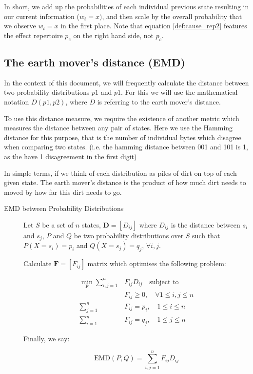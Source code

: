 In short, we add up the probabilities of each individual previous state resulting in our current information ($w_t = x)$, and then scale by the overall probability that we observe $w_t = x$ in the first place. Note that equation \ref{def:cause_rep2} features the effect repertoire $p_e$ on the right hand side, not $p_c$.




\subsection{The earth mover's distance (EMD)}
In the context of this document, we will frequently calculate the distance between two probability distributions $p1$ and $p1$. For this we will use the mathematical notation $D(p1,p2)$, where $D$ is referring to the earth mover's distance.

To use this distance measure, we require the existence of another metric which measures the distance between any pair of states. Here we use the Hamming distance for this purpose, that is the number of individual bytes which disagree when comparing two states. (i.e. the hamming distance between 001 and 101 is 1, as the have 1 disagreement in the first digit)

In simple terms, if we think of each distribution as piles of dirt on top of each given state. The earth mover's distance is the product of how much dirt needs to moved by how far this dirt needs to go. 

\begin{description}
	\item[EMD between Probability Distributions] Let $S$ be a set of $n$ states, $\mathbf{D} = \left[ D_{ij}\right]$ where $D_{ij}$ is the distance between $s_i$ and $s_j$, $P$ and $Q$ be two probability distributions over $S$ such that $P(X = s_i) = p_i$ and $Q(X=s_j) = q_j$, $\forall i,j$. 
	
	Calculate $\mathbf{F} = \left[F_{ij}\right]$ matrix which optimises the following problem:
	
	\begin{align}
	\label{eq:EMD1}
	\min \limits_{\mathbf{F}}\sum \limits_{i,j=1}^n &F_{ij} D_{ij}\quad \text{subject to}\\
	&F_{ij}\geq 0,\quad \forall 1 \leq i,j \leq n\\
	\sum \limits_{j=1}^n &F_{ij} = p_i,\quad 1 \leq i \leq n\\
	\sum \limits_{i=1}^n &F_{ij} = q_j,\quad 1 \leq j \leq n
	\end{align}
	
	Finally, we say: 
	
	\begin{equation}
	\label{def:EMD}
	\text{EMD}(P, Q) = \sum \limits_{i,j=1}^{n} F_{ij} D_{ij}
	\end{equation}
\end{description}

